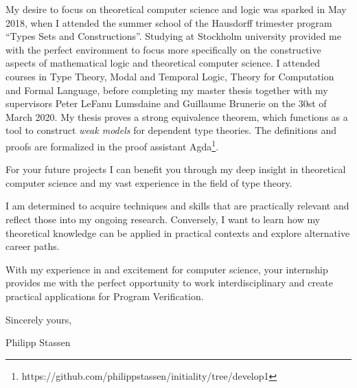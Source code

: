 \documentclass[10pt]{letter} %
\begin{document}
\begin{letter}{}
My desire to focus on theoretical computer science and logic was sparked in May 2018, when I attended the summer school of the Hausdorff trimester program ``Types Sets and Constructions''.
Studying at Stockholm university provided me with the perfect environment to focus more specifically on the constructive aspects of mathematical logic and theoretical computer science.
I attended courses in Type Theory, Modal and Temporal Logic, Theory for Computation and Formal Language, before completing my master thesis together with my supervisors Peter LeFanu Lumsdaine and Guillaume Brunerie on the 30st of March 2020.
My thesis proves a strong equivalence theorem, which functions as a tool to construct \emph{weak models} for dependent type theories.
The definitions and proofs are formalized in the proof assistant Agda\footnote{https://github.com/philippstassen/initiality/tree/develop1}.

For your future projects I can benefit you through my deep insight in theoretical computer science and my vast experience in the field of type theory.


I am determined to acquire techniques and skills that are practically relevant and reflect those into my ongoing research. Conversely, I want to learn how my theoretical knowledge can be applied in practical contexts and explore alternative career paths.

With my experience in and excitement for computer science,
your internship provides me with the perfect opportunity to work interdisciplinary and create practical applications for Program Verification.


Sincerely yours,

\smallskip
Philipp Stassen

\vfill
{} %




\end{letter}
\end{document}
